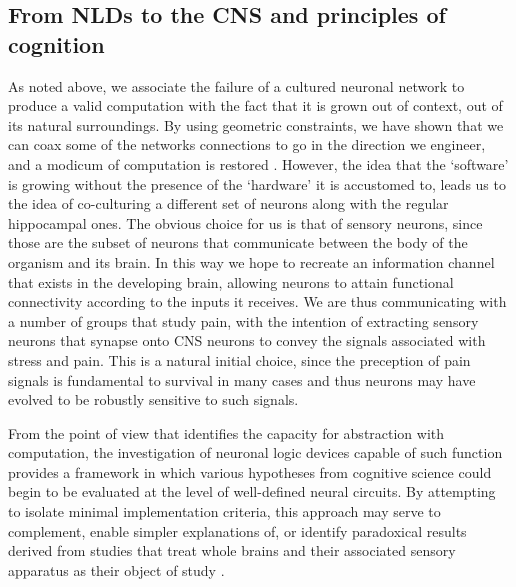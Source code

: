 \subsection{From NLDs to the CNS and principles of cognition}

As noted above, we associate the failure of a cultured neuronal network to produce a valid computation with the fact that it is grown out of context, out of its natural surroundings. By using geometric constraints, we have shown that we can coax some of the networks connections to go in the direction we engineer, and a modicum of computation is restored \cite{Feinerman2008}. However, the idea that the `software' is growing without the presence of the `hardware' it is accustomed to, leads us to the idea of co-culturing a different set of neurons along with the regular hippocampal ones. The obvious choice for us is that of sensory neurons, since those are the subset of neurons that communicate between the body of the organism and its brain. In this way we hope to recreate an information channel that exists in the developing brain, allowing neurons to attain functional connectivity according to the inputs it receives.
We are thus communicating with a number of groups that study pain, with the intention of extracting sensory neurons that synapse onto CNS neurons to convey the signals associated with stress and pain. This is a natural initial choice, since the preception of pain signals is fundamental to survival in many cases and thus neurons may have evolved to be robustly sensitive to such signals.

From the point of view that identifies the capacity for abstraction with
computation, the investigation of neuronal logic devices capable of such
function provides a framework in which various hypotheses from cognitive
science could begin to be evaluated at the level of well-defined neural
circuits. By attempting to isolate minimal implementation criteria, this
approach may serve to complement, enable simpler explanations of, or
identify paradoxical results derived from studies that treat whole
brains and their associated sensory apparatus as their object of study
\cite{McClelland2010,Griffiths2010}.

